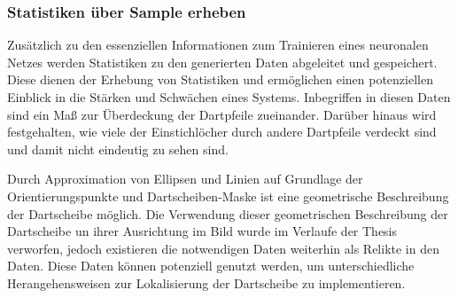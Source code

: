 \subsubsection{Statistiken über Sample erheben}

Zusätzlich zu den essenziellen Informationen zum Trainieren eines neuronalen Netzes werden Statistiken zu den generierten Daten abgeleitet und gespeichert. Diese dienen der Erhebung von Statistiken und ermöglichen einen potenziellen Einblick in die Stärken und Schwächen eines Systems. Inbegriffen in diesen Daten sind ein Maß zur Überdeckung der Dartpfeile zueinander. Darüber hinaus wird festgehalten, wie viele der Einstichlöcher durch andere Dartpfeile verdeckt sind und damit nicht eindeutig zu sehen sind.

Durch Approximation von Ellipsen und Linien auf Grundlage der Orientierungspunkte und Dartscheiben-Maske ist eine geometrische Beschreibung der Dartscheibe möglich. Die Verwendung dieser geometrischen Beschreibung der Dartscheibe un ihrer Ausrichtung im Bild wurde im Verlaufe der Thesis verworfen, jedoch existieren die notwendigen Daten weiterhin als Relikte in den Daten. Diese Daten können potenziell genutzt werden, um unterschiedliche Herangehensweisen zur Lokalisierung der Dartscheibe zu implementieren.

